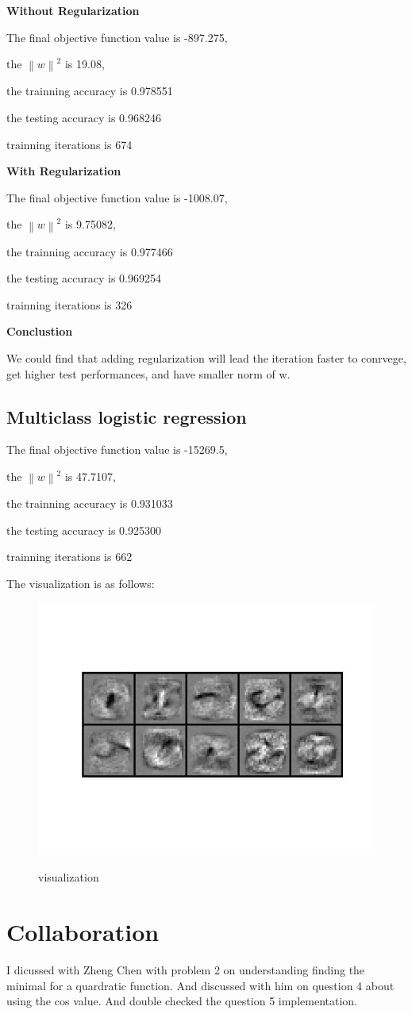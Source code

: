 \documentclass{article} %
\newcommand{\norm}[1]{\left\lVert #1 \right\rVert}
\begin{document}
\textbf{Without Regularization}

The final objective function value is -897.275,

the $\norm{w}^2$ is 19.08,

the trainning accuracy is 0.978551

the testing accuracy is 0.968246

trainning iterations is 674

\textbf{With Regularization}

The final objective function value is -1008.07,

the $\norm{w}^2$ is 9.75082,

the trainning accuracy is 0.977466

the testing accuracy is 0.969254

trainning iterations is 326

\textbf{Conclustion}

We could find that adding regularization will lead the iteration faster to
conrvege, get higher test performances, and have smaller norm of w.


\subsection{Multiclass logistic regression}
The final objective function value is -15269.5,

the $\norm{w}^2$ is 47.7107,

the trainning accuracy is 0.931033

the testing accuracy is 0.925300

trainning iterations is 662

The visualization is as follows:

\begin{figure}[h]
\begin{center}
\label{fig:nn}
\includegraphics[width=12cm]{pic/result.jpg}
\caption{visualization}
\end{center}
\end{figure}



\section{Collaboration}
I dicussed with Zheng Chen with problem 2 on understanding finding the minimal
for a quardratic function. And discussed with him on question 4 about using the
cos value. And double checked the question 5 implementation.
\end{document}
